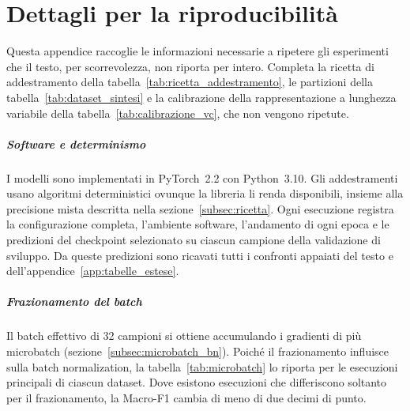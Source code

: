 
\chapter{Dettagli per la riproducibilità}
\label{app:riproducibilita}

Questa appendice raccoglie le informazioni necessarie a ripetere gli esperimenti che il testo, per scorrevolezza, non riporta per intero. Completa la ricetta di addestramento della tabella~\ref{tab:ricetta_addestramento}, le partizioni della tabella~\ref{tab:dataset_sintesi} e la calibrazione della rappresentazione a lunghezza variabile della tabella~\ref{tab:calibrazione_vc}, che non vengono ripetute.

\paragraph{Software e determinismo}
I modelli sono implementati in PyTorch~2.2 con Python~3.10. Gli addestramenti usano algoritmi deterministici ovunque la libreria li renda disponibili, insieme alla precisione mista descritta nella sezione~\ref{subsec:ricetta}. Ogni esecuzione registra la configurazione completa, l'ambiente software, l'andamento di ogni epoca e le predizioni del checkpoint selezionato su ciascun campione della validazione di sviluppo. Da queste predizioni sono ricavati tutti i confronti appaiati del testo e dell'appendice~\ref{app:tabelle_estese}.

\paragraph{Frazionamento del batch}
Il batch effettivo di 32 campioni si ottiene accumulando i gradienti di più microbatch (sezione~\ref{subsec:microbatch_bn}). Poiché il frazionamento influisce sulla batch normalization, la tabella~\ref{tab:microbatch} lo riporta per le esecuzioni principali di ciascun dataset. Dove esistono esecuzioni che differiscono soltanto per il frazionamento, la Macro-F1 cambia di meno di due decimi di punto.

